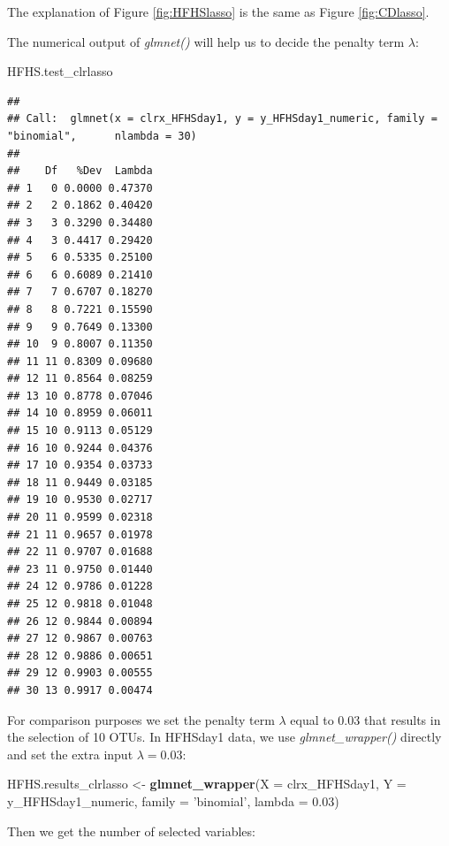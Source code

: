 \documentclass[openany]{book}
\newenvironment{Shaded}{\begin{snugshade}}{\end{snugshade}}
\newcommand{\KeywordTok}[1]{\textcolor[rgb]{0.13,0.29,0.53}{\textbf{#1}}}
\newcommand{\DataTypeTok}[1]{\textcolor[rgb]{0.13,0.29,0.53}{#1}}
\newcommand{\FloatTok}[1]{\textcolor[rgb]{0.00,0.00,0.81}{#1}}
\newcommand{\StringTok}[1]{\textcolor[rgb]{0.31,0.60,0.02}{#1}}
\newcommand{\OperatorTok}[1]{\textcolor[rgb]{0.81,0.36,0.00}{\textbf{#1}}}
\newcommand{\NormalTok}[1]{#1}
\begin{document}
The explanation of Figure \ref{fig:HFHSlasso} is the same as Figure
\ref{fig:CDlasso}.

The numerical output of \emph{glmnet()} will help us to decide the
penalty term \(\lambda\):

\begin{Shaded}
\begin{Highlighting}[]
\NormalTok{HFHS.test_clrlasso}
\end{Highlighting}
\end{Shaded}

\begin{verbatim}
## 
## Call:  glmnet(x = clrx_HFHSday1, y = y_HFHSday1_numeric, family = "binomial",      nlambda = 30) 
## 
##    Df   %Dev  Lambda
## 1   0 0.0000 0.47370
## 2   2 0.1862 0.40420
## 3   3 0.3290 0.34480
## 4   3 0.4417 0.29420
## 5   6 0.5335 0.25100
## 6   6 0.6089 0.21410
## 7   7 0.6707 0.18270
## 8   8 0.7221 0.15590
## 9   9 0.7649 0.13300
## 10  9 0.8007 0.11350
## 11 11 0.8309 0.09680
## 12 11 0.8564 0.08259
## 13 10 0.8778 0.07046
## 14 10 0.8959 0.06011
## 15 10 0.9113 0.05129
## 16 10 0.9244 0.04376
## 17 10 0.9354 0.03733
## 18 11 0.9449 0.03185
## 19 10 0.9530 0.02717
## 20 11 0.9599 0.02318
## 21 11 0.9657 0.01978
## 22 11 0.9707 0.01688
## 23 11 0.9750 0.01440
## 24 12 0.9786 0.01228
## 25 12 0.9818 0.01048
## 26 12 0.9844 0.00894
## 27 12 0.9867 0.00763
## 28 12 0.9886 0.00651
## 29 12 0.9903 0.00555
## 30 13 0.9917 0.00474
\end{verbatim}

For comparison purposes we set the penalty term \(\lambda\) equal to
0.03 that results in the selection of 10 OTUs. In HFHSday1 data, we use
\emph{glmnet\_wrapper()} directly and set the extra input
\textbf{\(\lambda = 0.03\)}:

\begin{Shaded}
\begin{Highlighting}[]
\NormalTok{HFHS.results_clrlasso <-}\StringTok{ }\KeywordTok{glmnet_wrapper}\NormalTok{(}\DataTypeTok{X =}\NormalTok{ clrx_HFHSday1, }\DataTypeTok{Y =}\NormalTok{ y_HFHSday1_numeric, }
                                        \DataTypeTok{family =} \StringTok{'binomial'}\NormalTok{, }\DataTypeTok{lambda =} \FloatTok{0.03}\NormalTok{) }
\end{Highlighting}
\end{Shaded}

Then we get the number of selected variables:

\begin{Shaded}
\end{Shaded}
\end{document}
